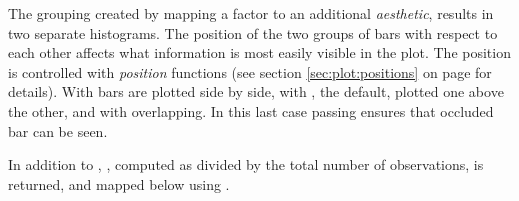 \documentclass[krantz2]{krantz}\usepackage{knitr}
\begin{document}
The grouping created by mapping a factor to an additional \emph{aesthetic}, results in two separate histograms. The position of the two groups of bars with respect to each other affects what information is most easily visible in the plot. The position is controlled with \emph{position} functions (see section \ref{sec:plot:positions} on page \pageref{sec:plot:positions} for details). With  bars are plotted side by side, with , the default, plotted one above the other, and with  overlapping. In this last case passing  ensures that occluded bar can be seen.



\begin{knitrout}\footnotesize
{}\color{fgcolor}\begin{kframe}
\begin{alltt}
 \hlkwb{<-}
  \hlstd{(} 
          \hlstd{=} \hlstd{(}   
\end{alltt}
\end{kframe}
\end{knitrout}

\begin{knitrout}\footnotesize
{}\color{fgcolor}\begin{kframe}
\begin{alltt}
 \hlkwb{<-}  \hlopt{+} \hlstd{(} \hlstd{=} \hlstd{,}  \hlstd{=} \hlstd{)}
\end{alltt}
\end{kframe}
\end{knitrout}

In addition to , , computed as  divided by the total number of observations, is returned, and mapped below using .

\begin{knitrout}\footnotesize
{}\color{fgcolor}\begin{kframe}
\begin{alltt}
 \hlkwb{<-}  \hlopt{+} \hlstd{(} \hlstd{=} \hlstd{(} \hlstd{=} 
                               \hlstd{=} \hlstd{,}  \hlstd{=} \hlstd{)}
\end{alltt}
\end{kframe}
\end{knitrout}
\end{document}
